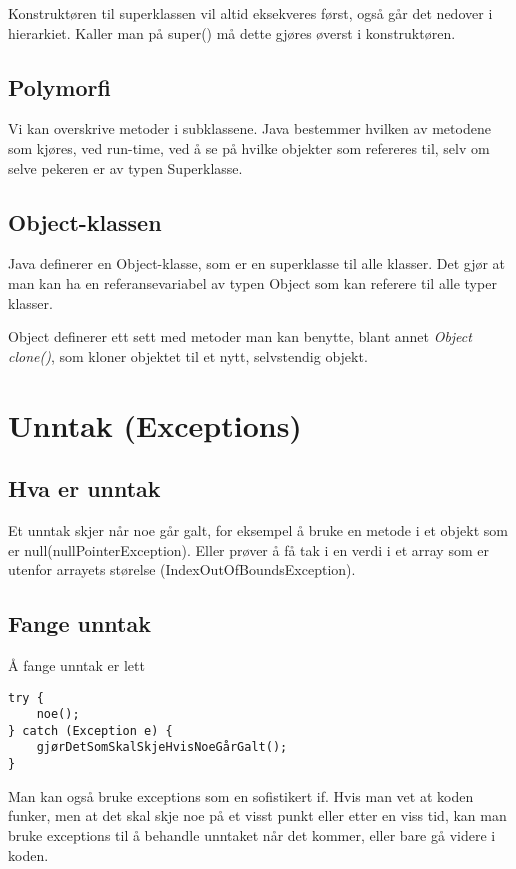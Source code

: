 \documentclass[11pt]{article}
\begin{document}
Konstruktøren til superklassen vil altid eksekveres først, også går
det nedover i hierarkiet. Kaller man på super() må dette gjøres øverst
i konstruktøren.
\subsection{Polymorfi}
\label{sec-15-4}

Vi kan overskrive metoder i subklassene. Java bestemmer hvilken av
metodene som kjøres, ved run-time, ved å se på hvilke objekter som
refereres til, selv om selve pekeren er av typen Superklasse. 
\subsection{Object-klassen}
\label{sec-15-5}

Java definerer en Object-klasse, som er en superklasse til alle
klasser. Det gjør at man kan ha en referansevariabel av typen Object
som kan referere til alle typer klasser.

Object definerer ett sett med metoder man kan benytte, blant annet
\emph{Object clone()}, som kloner objektet til et nytt, selvstendig objekt.
\section{Unntak (Exceptions)}
\label{sec-16}
\subsection{Hva er unntak}
\label{sec-16-1}

Et unntak skjer når noe går galt, for eksempel å bruke en metode i et objekt
som er null(nullPointerException). Eller prøver å få tak i en verdi i et array
som er utenfor arrayets størelse (IndexOutOfBoundsException).
\subsection{Fange unntak}
\label{sec-16-2}

Å fange unntak er lett


\begin{verbatim}
try { 
    noe();
} catch (Exception e) {
    gjørDetSomSkalSkjeHvisNoeGårGalt();
}
\end{verbatim}

Man kan også bruke exceptions som en sofistikert if. Hvis man vet at koden funker, men at det
skal skje noe på et visst punkt eller etter en viss tid, kan man bruke exceptions til å
behandle unntaket når det kommer, eller bare gå videre i koden.
\end{document}
